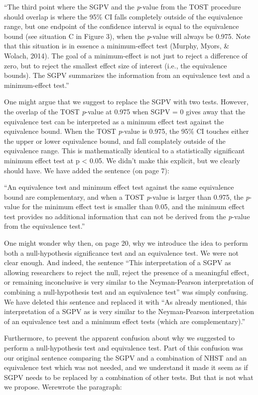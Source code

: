 \documentclass[man]{apa6}
\begin{document}
\enquote{The third point where the SGPV and the \emph{p}-value from the TOST procedure should overlap is where the 95\% CI falls completely outside of the equivalence range, but one endpoint of the confidence interval is equal to the equivalence bound (see situation C in Figure 3), when the \emph{p}-value will always be 0.975. Note that this
situation is in essence a minimum-effect test (Murphy, Myors, \& Wolach, 2014). The goal of a minimum-effect is not just to reject a difference of zero, but to reject the smallest effect size of interest (i.e., the equivalence bounds). The SGPV summarizes the information from an equivalence test and a minimum-effect test.}

One might argue that we suggest to replace the SGPV with two tests. However, the overlap of the TOST \emph{p}-value at 0.975 when SGPV = 0 gives away that the equivalence test can be interpreted as a minimum effect test against the equivalence bound. When the TOST \emph{p}-value is 0.975, the 95\% CI touches either the upper or lower equivalence bound, and fall complately outside of the equivalence range. This is mathematically identical to a statistically significant minimum effect test at p \textless{} 0.05. We didn't make this explicit, but we clearly should have. We have added the sentence (on page 7):

\enquote{An equivalence test and minimum effect test against the same equivalence bound are complementary, and when a TOST \emph{p}-value is larger than 0.975, the \emph{p}-value for the minimum effect test is smaller than 0.05, and the minimum effect test provides no additional information that can not be derived from the \emph{p}-value from the equivalence test.}

One might wonder why then, on page 20, why we introduce the idea to perform both a null-hypothesis significance test and an equivalence test. We were not clear enough. And indeed, the sentence \enquote{This interpretation of a SGPV as allowing researchers to reject the null, reject the presence of a meaningful effect, or remaining inconclusive is very similar to the Neyman-Pearson interpretation of combining a null-hypothesis test and an equivalence test} was simply confusing. We have deleted this sentence and replaced it with \enquote{As already mentioned, this interpretation of a SGPV as is very similar to the Neyman-Pearson interpretation of an equivalence test and a minimum effect tests (which are complementary).}

Furthermore, to prevent the apparent confusion about why we suggested to perform a null-hypothesis test and equivalence test. Part of this confusion was our original sentence comparing the SGPV and a combination of NHST and an equivalence test which was not needed, and we understand it made it seem as if SGPV needs to be replaced by a combination of other tests. But that is not what we propose. Werewrote the paragraph:
\end{document}

